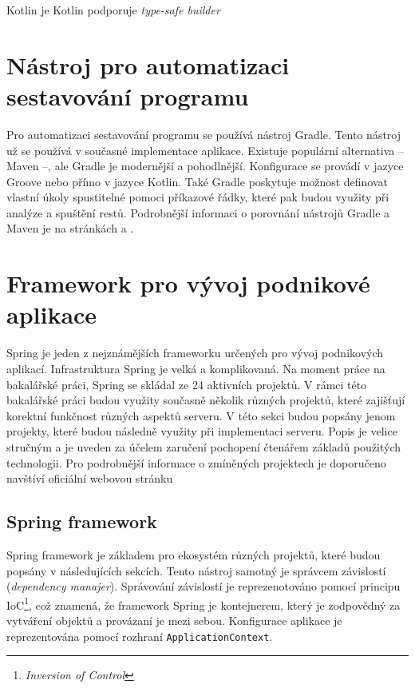     
    Kotlin je Kotlin podporuje \textit{type-safe builder}

\section{Nástroj pro automatizaci sestavování programu}\label{resere:build}
    Pro automatizaci sestavování programu se používá nástroj Gradle. Tento nástroj už se používá v současné implementace aplikace. Existuje populární alternativa -- Maven --, ale Gradle je modernější a pohodlnější. Konfigurace se provádí v jazyce Groove nebo přímo v jazyce Kotlin. Také Gradle poskytuje možnost definovat vlastní úkoly spustitelné pomoci příkazové řádky, které pak budou využity při analýze a spuštění restů. Podrobnější informaci o porovnání nástrojů Gradle a Maven je na stránkách \cite{grale-vs-mavem} a \cite{gradle-vs-maven-bealsung}.

\section{Framework pro vývoj podnikové aplikace}\label{resere:j2ee}
    Spring je jeden z nejznámějších frameworku určených pro vývoj podnikových aplikací. Infrastruktura Spring je velká a komplikovaná. Na moment práce na bakalářské práci, Spring se skládal ze 24 aktivních projektů\cite{spring-projects}. V rámci této bakalářské práci budou využity současně několik různých projektů, které zajišťují korektní funkčnost různých aspektů serveru. V této sekci budou popsány jenom projekty, které budou následně využity při implementaci serveru. Popis je velice stručným a je uveden za účelem zaručení pochopení čtenářem základů použitých technologii. Pro podrobnější informace o zmíněných projektech je doporučeno navštíví oficiální webovou stránku\cite{spring-official}
    
    \subsection{Spring framework}
        \cite{spring-framework}
        Spring framework je základem pro ekosystém různých projektů, které budou popsány v následujících sekcích. Tento nástroj samotný je správcem závislostí (\textit{dependency manajer}). Správování závislostí je reprezenotováno pomocí principu IoC\footnote{\textit{Inversion of Control}}, což znamená, že framework Spring je kontejnerem, který je zodpovědný za vytváření objektů a provázaní je mezi sebou. Konfigurace aplikace je reprezentována pomocí rozhraní \texttt{ApplicationContext}.
        
